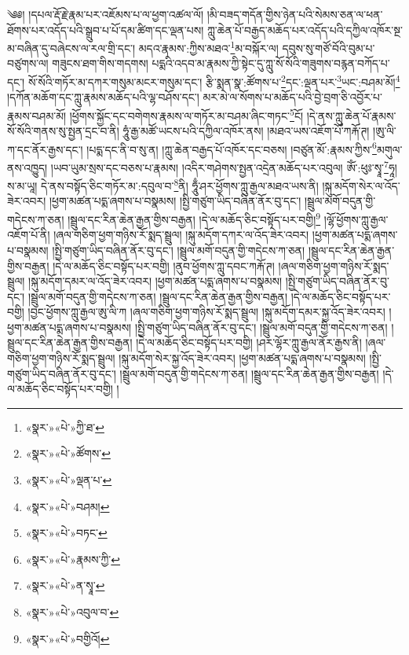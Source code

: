 ༄༅། །དཔལ་རྡོ་རྗེ་རྣམ་པར་འཇོམས་པ་ལ་ཕྱག་འཚལ་ལོ། །མི་བཟད་གདོན་གྱིས་ཉེན་པའི་སེམས་ཅན་ལ་ཕན་ཐོགས་པར་འདོད་པའི་སྒྲུབ་པ་པོ་དམ་ཚིག་དང་ལྡན་པས། ཀླུ་ཆེན་པོ་བརྒྱད་མཆོད་པར་འདོད་པའི་དཀྱིལ་འཁོར་སྔ་མ་བཞིན་དུ་བཞེངས་ལ་རལ་གྲི་དང་། མདའ་རྣམས་:ཀྱིས་མཐའ་\footnote{«སྣར་»«པེ་»ཀྱི་ཐ་}མ་བསྐོར་ལ། དབུས་སུ་གཙོ་བོའི་བུམ་པ་བཙུགས་ལ། གཟུངས་ཐག་གིས་གདགས། པདྨའི་འདབ་མ་རྣམས་ཀྱི་སྟེང་དུ་ཀླུ་སོ་སོའི་གཟུགས་བརྙན་བཀོད་པ་དང་། སོ་སོའི་གཏོར་མ་དཀར་གསུམ་མངར་གསུམ་དང་། རྩི་སྨན་སྣ་:ཚོགས་པ་\footnote{«སྣར་»«པེ་»ཚོགས་}དང་:ལྡན་པར་\footnote{«སྣར་»«པེ་»ལྡན་པ་}ཡང་:བཤམ་མོ།\footnote{«སྣར་»«པེ་»བཤམ།} །དཀོན་མཆོག་དང་ཀླུ་རྣམས་མཆོད་པའི་ལྷ་བཤོས་དང་། མར་མེ་ལ་སོགས་པ་མཆོད་པའི་བྱེ་བྲག་ཅི་འབྱོར་པ་རྣམས་བཤམ་མོ། །ཕྱོགས་སྐྱོང་དང་བགེགས་རྣམས་ལ་གཏོར་མ་བཤམ་ཞིང་གཏང་\footnote{«སྣར་»«པེ་»བཏང་}ངོ། །དེ་ནས་ཀླུ་ཆེན་པོ་རྣམས་སོ་སོའི་གནས་སུ་སྤྱན་དྲང་བ་ནི། ཧཱུཾ་རྒྱ་མཚོ་ཡངས་པའི་དཀྱིལ་འཁོར་ནས། །མཐའ་ཡས་འཇོག་པོ་ཀརྐོ་ཊ། །ཨུ་ལི་ཀ་དང་ནོར་རྒྱས་དང་། །པདྨ་དང་ནི་བ་སུ་ན། །ཀླུ་ཆེན་བརྒྱད་པོ་འཁོར་དང་བཅས། །བཙུན་མོ་:རྣམས་ཀྱིས་\footnote{«སྣར་»«པེ་»རྣམས་ཀྱི་}མགུལ་ནས་འཁྱུད། །ཡབ་ཡུམ་སྲས་དང་བཅས་པ་རྣམས། །འདིར་གཤེགས་སྤྱན་འདྲེན་མཆོད་པར་འབུལ། ཨོཾ་:ཕུཿ་སྭཱ་\footnote{«སྣར་»«པེ་»ན་སྭཱ་}ཧཱ། ས་མ་ཡཱ། དེ་ནས་བསྟོད་ཅིང་གཏོར་མ་:དབུལ་བ་\footnote{«སྣར་»«པེ་»འབུལ་བ་}ནི། ཧཱུྃ་ཤར་ཕྱོགས་ཀླུ་རྒྱལ་མཐའ་ཡས་ནི། །སྐུ་མདོག་སེར་ལ་འོད་ཟེར་འབར། །ཕྱག་མཚན་པདྨ་ཞགས་པ་བསྣམས། །སྤྱི་གཙུག་ཡིད་བཞིན་ནོར་བུ་དང་། །སྦྲུལ་མགོ་བདུན་གྱི་གདེངས་ཀ་ཅན། །སྦྲུལ་དང་རིན་ཆེན་རྒྱན་གྱིས་བརྒྱན། །དེ་ལ་མཆོད་ཅིང་བསྟོད་པར་བགྱི།\footnote{«སྣར་»«པེ་»བགྱིའོ།} །ལྷོ་ཕྱོགས་ཀླུ་རྒྱལ་འཇོག་པོ་ནི། །ཞལ་གཅིག་ཕྱག་གཉིས་རོ་སྨད་སྦྲུལ། །སྐུ་མདོག་དཀར་ལ་འོད་ཟེར་འབར། །ཕྱག་མཚན་པདྨ་ཞགས་པ་བསྣམས། །སྤྱི་གཙུག་ཡིད་བཞིན་ནོར་བུ་དང་། །སྦྲུལ་མགོ་བདུན་གྱི་གདེངས་ཀ་ཅན། །སྦྲུལ་དང་རིན་ཆེན་རྒྱན་གྱིས་བརྒྱན། །དེ་ལ་མཆོད་ཅིང་བསྟོད་པར་བགྱི། །ནུབ་ཕྱོགས་ཀླུ་དབང་ཀརྐོ་ཊ། །ཞལ་གཅིག་ཕྱག་གཉིས་རོ་སྨད་སྦྲུལ། །སྐུ་མདོག་དམར་ལ་འོད་ཟེར་འབར། །ཕྱག་མཚན་པདྨ་ཞགས་པ་བསྣམས། །སྤྱི་གཙུག་ཡིད་བཞིན་ནོར་བུ་དང་། །སྦྲུལ་མགོ་བདུན་གྱི་གདེངས་ཀ་ཅན། །སྦྲུལ་དང་རིན་ཆེན་རྒྱན་གྱིས་བརྒྱན། །དེ་ལ་མཆོད་ཅིང་བསྟོད་པར་བགྱི། །བྱང་ཕྱོགས་ཀླུ་རྒྱལ་ཨུ་ལི་ཀ །ཞལ་གཅིག་ཕྱག་གཉིས་རོ་སྨད་སྦྲུལ། །སྐུ་མདོག་དམར་སྐྱ་འོད་ཟེར་འབར། །ཕྱག་མཚན་པདྨ་ཞགས་པ་བསྣམས། །སྤྱི་གཙུག་ཡིད་བཞིན་ནོར་བུ་དང་། །སྦྲུལ་མགོ་བདུན་གྱི་གདེངས་ཀ་ཅན། །སྦྲུལ་དང་རིན་ཆེན་རྒྱན་གྱིས་བརྒྱན། །དེ་ལ་མཆོད་ཅིང་བསྟོད་པར་བགྱི། །ཤར་ལྷོར་ཀླུ་རྒྱལ་ནོར་རྒྱས་ནི། །ཞལ་གཅིག་ཕྱག་གཉིས་རོ་སྨད་སྦྲུལ། །སྐུ་མདོག་སེར་སྐྱ་འོད་ཟེར་འབར། །ཕྱག་མཚན་པདྨ་ཞགས་པ་བསྣམས། །སྤྱི་གཙུག་ཡིད་བཞིན་ནོར་བུ་དང་། །སྦྲུལ་མགོ་བདུན་གྱི་གདེངས་ཀ་ཅན། །སྦྲུལ་དང་རིན་ཆེན་རྒྱན་གྱིས་བརྒྱན། །དེ་ལ་མཆོད་ཅིང་བསྟོད་པར་བགྱི། །
